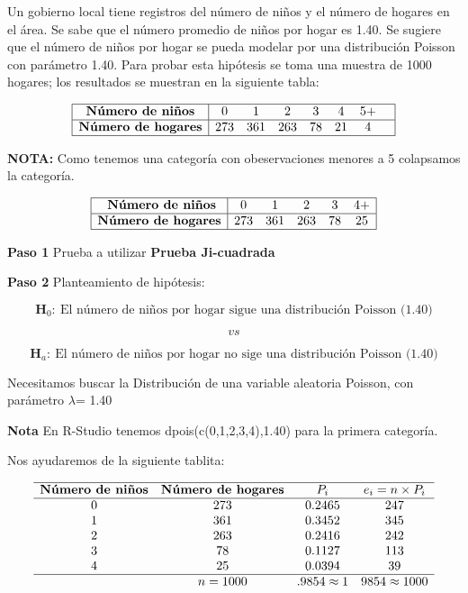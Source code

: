 \documentclass[
  a4paper,
  oneside,
  openany]{book}
\begin{document}
Un gobierno local tiene registros del número de niños y el número de hogares en el área. Se sabe que el número promedio de niños por hogar es 1.40. Se sugiere que el número de niños por hogar se pueda modelar por una distribución Poisson con parámetro 1.40.
Para probar esta hipótesis se toma una muestra de 1000 hogares; los resultados se muestran en la siguiente tabla:

\[
\begin{array}{|c |c c c c c c c|}
\hline
\textbf{Número de niños} &0 &1 &2& 3&4 &5+& \\
\hline
\textbf{Número de hogares} & 273& 361&263 &78 & 21 & 4& \\
\hline
\end{array}
\]

\textbf{NOTA:} Como tenemos una categoría con obeservaciones menores a 5 colapsamos la categoría.

\[
\begin{array}{|c |c c c c c|}
\hline
\textbf{  Número de niños} &0 &1 &2& 3&4+  \\
\hline
\textbf{Número de hogares} & 273& 361&263 &78 & 25  \\
\hline
\end{array}
\]

\textbf{Paso 1} Prueba a utilizar \textbf{Prueba Ji-cuadrada}

\textbf{Paso 2} Planteamiento de hipótesis:

\[\textbf{H}_0: \ \mbox{El número de niños por hogar sigue una distribución Poisson (1.40)}\]

\[vs\]

\[\textbf{H}_a: \ \mbox{El número de niños por hogar no sige una distribución Poisson (1.40)}\]

Necesitamos buscar la Distribución de una variable aleatoria Poisson, con parámetro \(\lambda\)= 1.40

\textbf{Nota} En R-Studio tenemos dpois(c(0,1,2,3,4),1.40) para la primera categoría.

Nos ayudaremos de la siguiente tablita:

\[
\begin{array}{c c c c c}
\hline
\textbf{Número de niños} & \textbf{Número de hogares} & P_{i} & e_i=n \times P_i \\
\hline
0&273&0.2465&247 \\
1&361&0.3452&345 \\
2&263&0.2416&242 \\
3&78&0.1127&113 \\
4&25&0.0394&39 \\
\hline
&n=1000&.9854\approx1 &9854\approx1000 \\
\end{array}
\]
\end{document}

